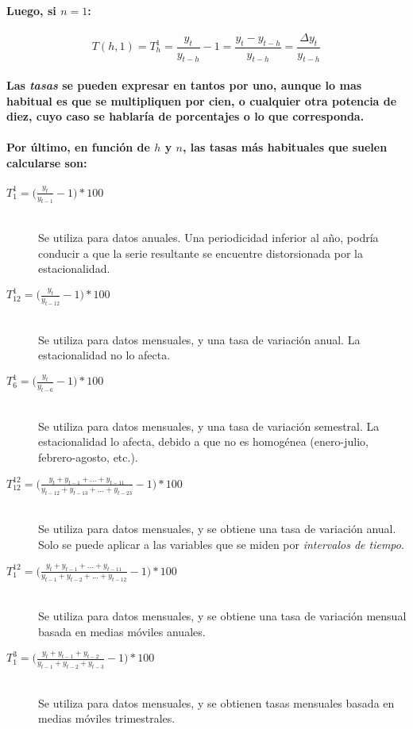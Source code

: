 \paragraph{
Luego, si $n=1$:
}
\begin{equation}
T(h,1) = T_h^1 = \frac{y_t}{y_{t-h}} -1 = \displaystyle\frac{y_t - y_{t-h}}{y_{t-h}} = \displaystyle\frac{\Delta y_t}{y_{t-h}}
\end{equation}
\paragraph{
Las \emph{tasas} se pueden expresar en tantos por uno, aunque lo mas habitual es que se multipliquen por cien, o cualquier otra potencia de diez, cuyo caso se hablaría de porcentajes o lo que corresponda.
}
\paragraph{
Por último, en función de $h$ y $n$, las tasas más habituales que suelen calcularse son:
}
\begin{description}
\item[$T_1^1 = \big(\displaystyle\frac{y_t}{y_{t-1}}-1\big)*100$]
\ \\Se utiliza para datos anuales. Una periodicidad inferior al año, podría conducir a que la serie resultante se encuentre distorsionada por la estacionalidad.
\item[$T_{12}^1 = \big(\displaystyle\frac{y_t}{y_{t-12}}-1\big)*100 $]
\ \\Se utiliza para datos mensuales, y una tasa de variación anual. La estacionalidad no lo afecta.
\item[$T_6^1 = \big(\displaystyle\frac{y_t}{y_{t-6}}-1\big)*100 $]
\ \\Se utiliza para datos mensuales, y una tasa de variación semestral. La estacionalidad lo afecta, debido a que no es homogénea (enero-julio, febrero-agosto, etc.).
\item[$T_{12}^{12} = \big(\displaystyle\frac{y_t+y_{t-1}+...+y_{t-11}}{y_{t-12}+y_{t-13}+...+y_{t-23}}-1\big)*100 $]
\ \\Se utiliza para datos mensuales, y se obtiene una tasa de variación anual. Solo se puede aplicar a las variables que se miden por \emph{intervalos de tiempo}\footnotemark[8].
\item[$T_1^{12} = \big(\displaystyle\frac{y_t+y_{t-1}+...+y_{t-11}}{y_{t-1}+y_{t-2}+...+y_{t-12}}-1\big)*100 $]
\ \\Se utiliza para datos mensuales, y se obtiene una tasa de variación mensual basada en medias móviles anuales.
\item[$T_1^{3} = \big(\displaystyle\frac{y_t+y_{t-1}+y_{t-2}}{y_{t-1}+y_{t-2}+y_{t-3}}-1\big)*100 $]
\ \\Se utiliza para datos mensuales, y se obtienen tasas mensuales basada en medias móviles trimestrales.
\end{description}
